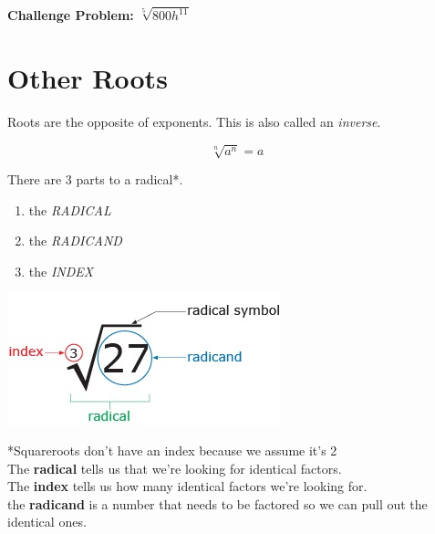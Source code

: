 \documentclass[12pt]{article}
\begin{document}
 \textbf{Challenge Problem:} $\sqrt[5]{800h^{11}}$

\section*{Other Roots}

Roots are the opposite of exponents. This is also called an \textit{inverse}.\\

\begin{LARGE}
	$$\sqrt[n]{a^n}=a$$
\end{LARGE}



\hrulefill

There are 3 parts to a radical*.

\begin{enumerate}

	\item the \textit{RADICAL}\\
	
	\item the \textit{RADICAND}\\
	
	\item the \textit{INDEX}\\
\end{enumerate}

\begin{center}
\includegraphics[scale=.7]{radical.jpg}
\end{center}

*Squareroots don't have an index because we assume it's 2\\

The \textbf{radical} tells us that we're looking for identical factors.\\

The \textbf{index} tells us how many identical factors we're looking for.\\

the \textbf{radicand} is a number that needs to be factored so we can pull out the identical ones.\\
\end{document}
